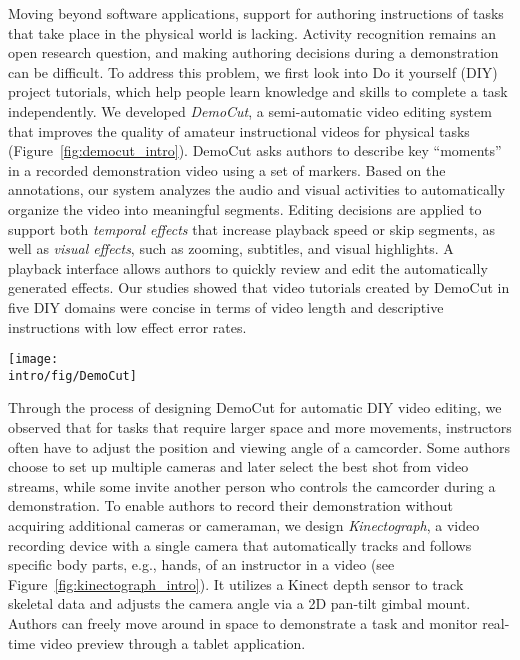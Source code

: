 
Moving beyond software applications, support for authoring instructions of tasks that take place in the physical world is lacking. Activity recognition remains an open research question, and making authoring decisions during a demonstration can be difficult.
%
To address this problem, we first look into Do it yourself (DIY) project tutorials, which help people learn knowledge and skills to complete a task independently.
%
We developed \emph{DemoCut}, a semi-automatic video editing system that improves the quality of amateur instructional videos for physical tasks (Figure~\ref{fig:democut_intro}). DemoCut asks authors to describe key ``moments'' in a recorded demonstration video using a set of markers. Based on the annotations, our system analyzes the audio and visual activities to automatically organize the video into meaningful segments. Editing decisions are applied to support both \emph{temporal effects} that increase playback speed or skip segments, as well as \emph{visual effects}, such as zooming, subtitles, and visual highlights. A playback interface allows authors to quickly review and edit the automatically generated effects.
%
Our studies showed that video tutorials created by DemoCut in five DIY domains were concise in terms of video length and descriptive instructions with low effect error rates.

\begin{figure*}[t]
  \centering
  \texttt{[image: \\intro/fig/DemoCut]}
  \caption{DemoCut asks authors to mark key moments in a recorded video of demonstration using a set of marker types. Based on marker information, the system uses audio and video analysis to automatically organize the video into meaningful segments and apply appropriate video editing effects, which can be modified via a playback UI.}
  \label{fig:democut_intro}
\end{figure*}

Through the process of designing DemoCut for automatic DIY video editing, we observed that for tasks that require larger space and more movements, instructors often have to adjust the position and viewing angle of a camcorder. Some authors choose to set up multiple cameras and later select the best shot from video streams, while some invite another person who controls the camcorder during a demonstration.
%
To enable authors to record their demonstration without acquiring additional cameras or cameraman, we design \emph{Kinectograph}, a video recording device with a single camera that automatically tracks and follows specific body parts, e.g., hands, of an instructor in a video (see Figure~\ref{fig:kinectograph_intro}). It utilizes a Kinect depth sensor to track skeletal data and adjusts the camera angle via a 2D pan-tilt gimbal mount. Authors can freely move around in space to demonstrate a task and monitor real-time video preview through a tablet application.

